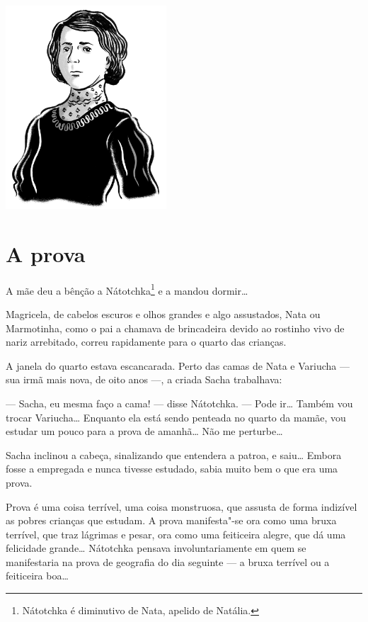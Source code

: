\pagebreak
\thispagestyle{empty}
\mbox{}
\vfill
\begin{center}
\includegraphics[width=6cm]{./imgs/autor10.jpg}
\end{center}


\chapter{A prova} \label{part12}

A mãe deu a bênção a Nátotchka\footnote{Nátotchka é diminutivo de
  Nata, apelido de Natália.} e a mandou dormir\ldots{}

Magricela, de cabelos escuros e olhos grandes e algo assustados, Nata ou
Marmotinha, como o pai a chamava de brincadeira devido ao rostinho
vivo de nariz arrebitado, correu rapidamente para o quarto das crianças.

A janela do quarto estava escancarada. Perto das camas de Nata e
Variucha --- sua irmã mais nova, de oito anos ---, a criada Sacha
trabalhava:

--- Sacha, eu mesma faço a cama! --- disse Nátotchka. --- Pode ir\ldots{}
Também vou trocar Variucha\ldots{} Enquanto ela está sendo penteada no quarto
da mamãe, vou estudar um pouco para a prova de amanhã\ldots{} Não me
perturbe\ldots{}

Sacha inclinou a cabeça, sinalizando que entendera a patroa, e saiu\ldots{}
Embora fosse a empregada e nunca tivesse estudado, sabia muito bem o que
era uma prova.

Prova é uma coisa terrível, uma coisa monstruosa, que assusta de forma
indizível as pobres crianças que estudam. A prova manifesta"-se ora como
uma bruxa terrível, que traz lágrimas e pesar, ora como uma feiticeira
alegre, que dá uma felicidade grande\ldots{} Nátotchka pensava
involuntariamente em quem se manifestaria na prova de geografia do dia
seguinte --- a bruxa terrível ou a feiticeira boa\ldots{}

